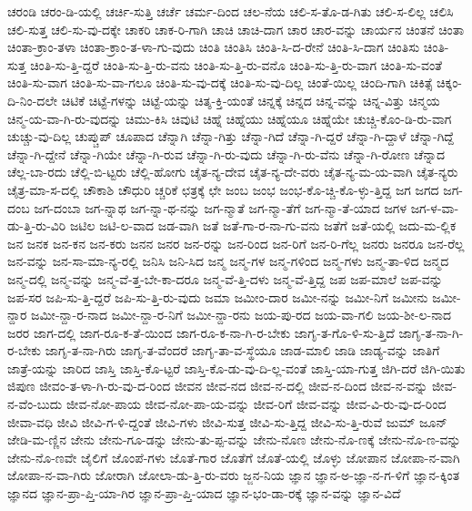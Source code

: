 {ಚರಂಡಿ
ಚರಂ-ಡಿ-ಯಲ್ಲಿ
ಚರ್ಚಿ-ಸುತ್ತಿ
ಚರ್ಚೆ
ಚರ್ಮ-ದಿಂದ
ಚಲ-ನೆಯ
ಚಲಿ-ಸ-ತೊ-ಡ-ಗಿತು
ಚಲಿ-ಸ-ಲಿಲ್ಲ
ಚಲಿಸಿ
ಚಲಿ-ಸುತ್ತ
ಚಲಿ-ಸು-ವು-ದಕ್ಕೇ
ಚಾಕರಿ
ಚಾಕ-ರಿ-ಗಾಗಿ
ಚಾಚಿ
ಚಾಚಿ-ದಾಗ
ಚಾರ
ಚಾರ-ವನ್ನು
ಚಾರ್ಯನ
ಚಿಂತನೆ
ಚಿಂತಾ
ಚಿಂತಾ-ಕ್ರಾಂ-ತಳಾ
ಚಿಂತಾ-ಕ್ರಾಂ-ತ-ಳಾ-ಗು-ವುದು
ಚಿಂತಿ
ಚಿಂತಿಸಿ
ಚಿಂತಿ-ಸಿ-ದ-ರೇನೆ
ಚಿಂತಿ-ಸಿ-ದಾಗ
ಚಿಂತಿಸು
ಚಿಂತಿ-ಸುತ್ತ
ಚಿಂತಿ-ಸು-ತ್ತಿ-ದ್ದರೆ
ಚಿಂತಿ-ಸು-ತ್ತಿ-ರು-ವನು
ಚಿಂತಿ-ಸು-ತ್ತಿ-ರು-ವನೊ
ಚಿಂತಿ-ಸು-ತ್ತಿ-ರು-ವಾಗ
ಚಿಂತಿ-ಸು-ವಂತೆ
ಚಿಂತಿ-ಸು-ವಾಗ
ಚಿಂತಿ-ಸು-ವಾ-ಗಲೂ
ಚಿಂತಿ-ಸು-ವು-ದಕ್ಕೆ
ಚಿಂತಿ-ಸು-ವು-ದಿಲ್ಲ
ಚಿಂತೆ-ಯಿಲ್ಲ
ಚಿಂದಿ-ಗಾಗಿ
ಚಿಕಿತ್ಸೆ
ಚಿಕ್ಕಂ-ದಿ-ನಿಂ-ದಲೇ
ಚಿಟಿಕೆ
ಚಿಟ್ಟೆ-ಗಳನ್ನು
ಚಿಟ್ಟೆ-ಯನ್ನು
ಚಿತ್ಶ-ಕ್ತಿ-ಯಂತೆ
ಚಿನ್ನಕ್ಕೆ
ಚಿನ್ನದ
ಚಿನ್ನ-ವನ್ನು
ಚಿನ್ನ-ವಿತ್ತು
ಚಿನ್ಮಯ
ಚಿನ್ಮ-ಯ-ವಾ-ಗಿ-ರು-ವುದನ್ನು
ಚಿಮು-ಕಿಸಿ
ಚಿವುಟಿ
ಚಿಹ್ನೆ
ಚಿಹ್ನೆಯು
ಚಿಹ್ನೆಯೂ
ಚಿಹ್ನೆಯೇ
ಚುಚ್ಚಿ-ಕೊಂ-ಡಿ-ರು-ವಾಗ
ಚುಚ್ಚು-ವು-ದಿಲ್ಲ
ಚುಪ್ಚುಪ್
ಚೂಪಾದ
ಚೆನ್ನಾಗಿ
ಚೆನ್ನಾ-ಗಿತ್ತು
ಚೆನ್ನಾ-ಗಿದೆ
ಚೆನ್ನಾ-ಗಿ-ದ್ದರೆ
ಚೆನ್ನಾ-ಗಿ-ದ್ದಾಳೆ
ಚೆನ್ನಾ-ಗಿದ್ದೆ
ಚೆನ್ನಾ-ಗಿ-ದ್ದೇನೆ
ಚೆನ್ನಾ-ಗಿಯೇ
ಚೆನ್ನಾ-ಗಿ-ರುವ
ಚೆನ್ನಾ-ಗಿ-ರು-ವುದು
ಚೆನ್ನಾ-ಗಿ-ರು-ವೆನು
ಚೆನ್ನಾ-ಗಿ-ರೋಣ
ಚೆನ್ನಾದ
ಚೆಲ್ಲ-ಬಾ-ರದು
ಚೆಲ್ಲಿ-ಬಿ-ಟ್ಟರು
ಚೆಲ್ಲಿ-ಹೋಗು
ಚೈತ-ನ್ಯ-ದೇವ
ಚೈತ-ನ್ಯ-ದೇ-ವರು
ಚೈತ-ನ್ಯ-ಮ-ಯ-ವಾಗಿ
ಚೈತ-ನ್ಯರು
ಚೈತ್ರ-ಮಾ-ಸ-ದಲ್ಲಿ
ಚೌಕಾಶಿ
ಚೌಧುರಿ
ಚ್ಚರಿಕೆ
ಛತ್ರಕ್ಕೆ
ಛೇ
ಜಂಬ
ಜಂಭ
ಜಂಭ-ಕೊ-ಚ್ಚಿ-ಕೊ-ಳ್ಳು-ತ್ತಿದ್ದ
ಜಗ
ಜಗದ
ಜಗ-ದಂಬ
ಜಗ-ದಂಬಾ
ಜಗ-ನ್ನಾಥ
ಜಗ-ನ್ನಾ-ಥ-ನನ್ನು
ಜಗ-ನ್ಮಾತೆ
ಜಗ-ನ್ಮಾ-ತೆಗೆ
ಜಗ-ನ್ಮಾ-ತೆ-ಯಾದ
ಜಗಳ
ಜಗ-ಳ-ವಾ-ಡು-ತ್ತಿ-ರು-ವಿರಿ
ಜಟಿಲ
ಜಟಿ-ಲ-ವಾದ
ಜಡ-ವಾಗಿ
ಜತೆ
ಜತೆ-ಗಾ-ರ-ನಾ-ಗು-ವನು
ಜತೆಗೆ
ಜತೆ-ಯಲ್ಲಿ
ಜದು-ಮ-ಲ್ಲಿಕ
ಜನ
ಜನಕ
ಜನ-ಕನ
ಜನ-ಕರು
ಜನನ
ಜನರ
ಜನ-ರನ್ನು
ಜನ-ರಿಂದ
ಜನ-ರಿಗೆ
ಜನ-ರಿ-ಗೆಲ್ಲ
ಜನರು
ಜನರೂ
ಜನ-ರೆಲ್ಲ
ಜನ-ವನ್ನು
ಜನ-ಸಾ-ಮಾ-ನ್ಯ-ರಲ್ಲಿ
ಜನಿಸಿ
ಜನಿ-ಸಿದ
ಜನ್ಮ
ಜನ್ಮ-ಗಳ
ಜನ್ಮ-ಗಳಿಂದ
ಜನ್ಮ-ಗಳು
ಜನ್ಮ-ತಾ-ಳಿದ
ಜನ್ಮದ
ಜನ್ಮ-ದಲ್ಲಿ
ಜನ್ಮ-ವನ್ನು
ಜನ್ಮ-ವೆ-ತ್ತ-ಬೇ-ಕಾ-ದರೂ
ಜನ್ಮ-ವೆ-ತ್ತಿ-ದಳು
ಜನ್ಮ-ವೆ-ತ್ತಿದ್ದ
ಜಪ
ಜಪ-ಮಾಲೆ
ಜಪ-ವನ್ನು
ಜಪ-ಸರ
ಜಪಿ-ಸು-ತ್ತಿ-ದ್ದರೆ
ಜಪಿ-ಸು-ತ್ತಿ-ರು-ವುದು
ಜಮಾ
ಜಮೀಂ-ದಾರ
ಜಮೀ-ನನ್ನು
ಜಮೀ-ನಿಗೆ
ಜಮೀನು
ಜಮೀ-ನ್ದಾರ
ಜಮೀ-ನ್ದಾ-ರ-ನಾದ
ಜಮೀ-ನ್ದಾ-ರ-ನಿಗೆ
ಜಮೀ-ನ್ದಾ-ರನು
ಜಯ-ಪು-ರದ
ಜಯ-ವಾ-ಗಲಿ
ಜಯ-ಶೀ-ಲ-ನಾದ
ಜರರ
ಜಾಗ-ದಲ್ಲಿ
ಜಾಗ-ರೂ-ಕ-ತೆ-ಯಿಂದ
ಜಾಗ-ರೂ-ಕ-ನಾ-ಗಿ-ರ-ಬೇಕು
ಜಾಗೃ-ತ-ಗೊ-ಳಿ-ಸು-ತ್ತಿದೆ
ಜಾಗೃ-ತ-ನಾ-ಗಿ-ರ-ಬೇಕು
ಜಾಗೃ-ತ-ನಾ-ಗಿರು
ಜಾಗೃ-ತ-ವೆಂದರೆ
ಜಾಗೃ-ತಾ-ವ-ಸ್ಥೆಯೂ
ಜಾಡ-ಮಾಲಿ
ಜಾಡಿ
ಜಾಡ್ಯ-ವನ್ನು
ಜಾತಿಗೆ
ಜಾತ್ರೆ-ಯನ್ನು
ಜಾರಿದ
ಜಾಸ್ತಿ
ಜಾಸ್ತಿ-ಕೊ-ಟ್ಟರೆ
ಜಾಸ್ತಿ-ಕೊ-ಡು-ವು-ದಿ-ಲ್ಲ-ವಂತೆ
ಜಾಸ್ತಿ-ಯಾ-ಗುತ್ತ
ಜಿಗಿ-ದರೆ
ಜಿಗಿ-ಯಿತು
ಜಿಪುಣ
ಜೀವಂ-ತ-ಳಾ-ಗಿ-ರು-ವು-ದ-ರಿಂದ
ಜೀವನ
ಜೀವ-ನದ
ಜೀವ-ನ-ದಲ್ಲಿ
ಜೀವ-ನ-ದಿಂದ
ಜೀವ-ನ-ವನ್ನು
ಜೀವ-ನ-ವೆಂ-ಬುದು
ಜೀವ-ನೋ-ಪಾಯ
ಜೀವ-ನೋ-ಪಾ-ಯ-ವನ್ನು
ಜೀವ-ರಿಗೆ
ಜೀವ-ವನ್ನು
ಜೀವ-ವಿ-ರು-ವು-ದ-ರಿಂದ
ಜೀವಾ-ವಧಿ
ಜೀವಿ
ಜೀವಿ-ಗ-ಳಿ-ದ್ದಂತೆ
ಜೀವಿ-ಗಳು
ಜೀವಿ-ಸುತ್ತ
ಜೀವಿ-ಸು-ತ್ತಿದ್ದ
ಜೀವಿ-ಸು-ತ್ತಿ-ರುವೆ
ಜುಮ್
ಜೂನ್
ಜೇಡಿ-ಮ-ಣ್ಣಿನ
ಜೇನು
ಜೇನು-ಗೂ-ಡನ್ನು
ಜೇನು-ತು-ಪ್ಪ-ವನ್ನು
ಜೇನು-ನೊಣ
ಜೇನು-ನೊ-ಣಕ್ಕೆ
ಜೇನು-ನೊ-ಣ-ವನ್ನು
ಜೇನು-ನೊ-ಣವೇ
ಜೈಲಿಗೆ
ಜೊಂಪೆ-ಗಳು
ಜೊತೆ-ಗಾರ
ಜೊತೆಗೆ
ಜೊತೆ-ಯಲ್ಲಿ
ಜೊಳ್ಳು
ಜೋಪಾನ
ಜೋಪಾ-ನ-ವಾಗಿ
ಜೋಪಾ-ನ-ವಾ-ಗಿರು
ಜೋರಾಗಿ
ಜೋಲಾ-ಡು-ತ್ತಿ-ರು-ವರು
ಜ್ಜನ-ನಿಯ
ಜ್ಞಾನ
ಜ್ಞಾನ-ಅ-ಜ್ಞಾ-ನ-ಗ-ಳಿಗೆ
ಜ್ಞಾನ-ಕ್ಕಿಂತ
ಜ್ಞಾನದ
ಜ್ಞಾನ-ಪ್ರಾ-ಪ್ತಿ-ಯಾ-ಗಿರ
ಜ್ಞಾನ-ಪ್ರಾ-ಪ್ತಿ-ಯಾದ
ಜ್ಞಾನ-ಭಂ-ಡಾ-ರಕ್ಕೆ
ಜ್ಞಾನ-ವನ್ನು
ಜ್ಞಾನ-ವಿದೆ
}
